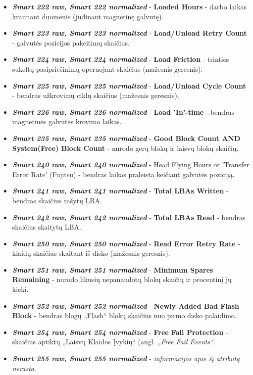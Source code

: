 \documentclass{VUMIFPSkursinis}
\begin{document}
\begin{itemize}
{TA Counter Detected} - neištaisomų programinės įrangos skaitymo klaidų skaičius (mažesnis geresnis).
\item \textit{\textbf{Smart 222 raw, Smart 222 normalized}} - \textbf{Loaded Hours} - darbo laikas kraunant duomenis (judinant magnetinę galvutę).
\item \textit{\textbf{Smart 223 raw, Smart 223 normalized}} - \textbf{Load/Unload Retry Count} - galvutės pozicijos pakeitimų skaičius.
\item \textit{\textbf{Smart 224 raw, Smart 224 normalized}} - \textbf{Load Friction} - trinties sukeltų pasipriešinimų operuojant skaičius (mažesnis geresnis).
\item \textit{\textbf{Smart 225 raw, Smart 225 normalized}} - \textbf{Load/Unload Cycle Count} - bendras užkrovimų ciklų skaičius (mažesnis geresnis).
\item \textit{\textbf{Smart 226 raw, Smart 226 normalized}} - \textbf{Load 'In'-time} - bendras magnetinės galvutės krovimo laikas.
\item \textit{\textbf{Smart 235 raw, Smart 235 normalized}} - \textbf{Good Block Count AND System(Free) Block Count} - nurodo gerų blokų ir laisvų blokų skaičių.
\item \textit{\textbf{Smart 240 raw, Smart 240 normalized}} - Head Flying Hours or 'Transfer Error Rate' (Fujitsu) - bendras laikas praleista keičiant galvutės poziciją.
\item \textit{\textbf{Smart 241 raw, Smart 241 normalized}} - \textbf{Total LBAs Written} - bendras skaičius rašytų LBA.
\item \textit{\textbf{Smart 242 raw, Smart 242 normalized}} - \textbf{Total LBAs Read} - bendras skaičius skaitytų LBA.
\item \textit{\textbf{Smart 250 raw, Smart 250 normalized}} - \textbf{Read Error Retry Rate} - klaidų skaičius skaitant iš disko (mažesnis geresnis).
\item \textit{\textbf{Smart 251 raw, Smart 251 normalized}} - \textbf{Minimum Spares Remaining} - nurodo likusių nepanaudotų blokų skaičių ir procentinį jų kiekį.
\item \textit{\textbf{Smart 252 raw, Smart 252 normalized}} - \textbf{Newly Added Bad Flash Block} - bendras blogų „Flash“ blokų skaičius nuo pirmo disko palaidimo.
\item \textit{\textbf{Smart 254 raw, Smart 254 normalized}} - \textbf{Free Fall Protection} - skaičius aptiktų „Laisvų Klaidos Įvykių“ (angl. \textit{„Free Fail Events“}.
\item \textit{\textbf{Smart 255 raw, Smart 255 normalized}} - \textit{informacijos apie šį atributą nerasta}.
\end{itemize}
\end{document}
